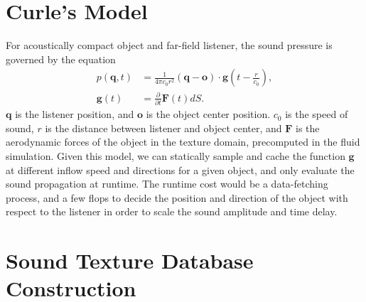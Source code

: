 \documentclass[tog]{acmsiggraph}
\def\p{\partial}
\def\f{\frac}
\def\mb{\mathbf}
\begin{document}
\section{Curle's Model}  \label{section:curle}

For acoustically compact object and far-field listener, the sound pressure is governed by the equation \cite{curle}
\begin{align}
    p(\mathbf{q}, t) &= \f{1}{4\pi c_0 r^2} (\mb{q} - \mb{o}) \cdot \mb{g}(t-\f{r}{c_0}), \\
    \mb{g}(t) &= \f{\p}{\p t}\mb{F}(t) dS.
\end{align}
$\mb{q}$ is the listener position, and $\mb{o}$ is the object center position. $c_0$ is the speed of sound, $r$ is the distance between listener and object center, and $\mb{F}$ is the aerodynamic forces of the object in the texture domain, precomputed in the fluid simulation. Given this model, we can statically sample and cache the function $\mb{g}$ at different inflow speed and directions for a given object, and only evaluate the sound propagation at runtime. The runtime cost would be a data-fetching process, and a few flops to decide the position and direction of the object with respect to the listener in order to scale the sound amplitude and time delay.


\section{Sound Texture Database Construction}  \label{section:sound_texture}
\end{document}
